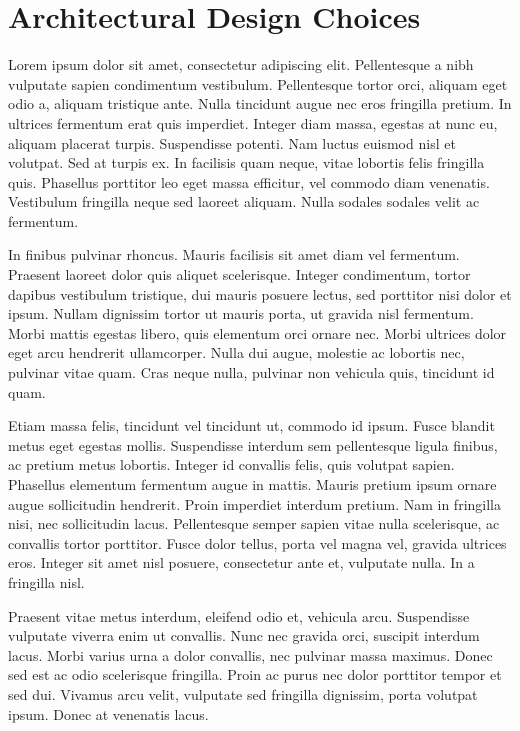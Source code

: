 \section{Architectural Design Choices }
\label{sec:lorem}
Lorem ipsum dolor sit amet, consectetur adipiscing elit. Pellentesque a nibh vulputate sapien condimentum vestibulum. Pellentesque tortor orci, aliquam eget odio a, aliquam tristique ante. Nulla tincidunt augue nec eros fringilla pretium. In ultrices fermentum erat quis imperdiet. Integer diam massa, egestas at nunc eu, aliquam placerat turpis. Suspendisse potenti. Nam luctus euismod nisl et volutpat. Sed at turpis ex. In facilisis quam neque, vitae lobortis felis fringilla quis. Phasellus porttitor leo eget massa efficitur, vel commodo diam venenatis. Vestibulum fringilla neque sed laoreet aliquam. Nulla sodales sodales velit ac fermentum.

In finibus pulvinar rhoncus. Mauris facilisis sit amet diam vel fermentum. Praesent laoreet dolor quis aliquet scelerisque. Integer condimentum, tortor dapibus vestibulum tristique, dui mauris posuere lectus, sed porttitor nisi dolor et ipsum. Nullam dignissim tortor ut mauris porta, ut gravida nisl fermentum. Morbi mattis egestas libero, quis elementum orci ornare nec. Morbi ultrices dolor eget arcu hendrerit ullamcorper. Nulla dui augue, molestie ac lobortis nec, pulvinar vitae quam. Cras neque nulla, pulvinar non vehicula quis, tincidunt id quam.

Etiam massa felis, tincidunt vel tincidunt ut, commodo id ipsum. Fusce blandit metus eget egestas mollis. Suspendisse interdum sem pellentesque ligula finibus, ac pretium metus lobortis. Integer id convallis felis, quis volutpat sapien. Phasellus elementum fermentum augue in mattis. Mauris pretium ipsum ornare augue sollicitudin hendrerit. Proin imperdiet interdum pretium. Nam in fringilla nisi, nec sollicitudin lacus. Pellentesque semper sapien vitae nulla scelerisque, ac convallis tortor porttitor. Fusce dolor tellus, porta vel magna vel, gravida ultrices eros. Integer sit amet nisl posuere, consectetur ante et, vulputate nulla. In a fringilla nisl.

Praesent vitae metus interdum, eleifend odio et, vehicula arcu. Suspendisse vulputate viverra enim ut convallis. Nunc nec gravida orci, suscipit interdum lacus. Morbi varius urna a dolor convallis, nec pulvinar massa maximus. Donec sed est ac odio scelerisque fringilla. Proin ac purus nec dolor porttitor tempor et sed dui. Vivamus arcu velit, vulputate sed fringilla dignissim, porta volutpat ipsum. Donec at venenatis lacus.

